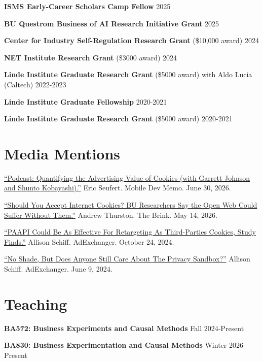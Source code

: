 \documentclass[letterpaper]{article}
\renewenvironment{itemize}{
  \begin{list}{}{
    \setlength{\leftmargin}{1.5em}
  }
}{
  \end{list}
}
\begin{document}
\begin{itemize}
\item \textbf{ISMS Early-Career Scholars Camp Fellow} \hfill 2025
\item \textbf{BU Questrom Business of AI Research Initiative Grant} \hfill 2025
\item \textbf{Center for Industry Self-Regulation Research Grant} (\$10,000 award) \hfill 2024
\item \textbf{NET Institute Research Grant} (\$3000 award) \hfill 2024
\item \textbf{Linde Institute Graduate Research Grant} (\$5000 award) with Aldo Lucia (Caltech) \hfill 2022-2023
\item \textbf{Linde Institute Graduate Fellowship} \hfill 2020-2021 
\item \textbf{Linde Institute Graduate Research Grant} (\$5000 award) \hfill 2020-2021
\end{itemize}

\section*{Media Mentions}
\begin{itemize}
\item \href{https://mobiledevmemo.com/podcast-quantifying-the-advertising-value-of-cookies-with-garrett-johnson-and-shunto-kobayashi/}{``Podcast: Quantifying the Advertising Value of Cookies (with Garrett Johnson and Shunto Kobayashi).''} Eric Seufert. Mobile Dev Memo. June 30, 2026.
\item \href{https://www.bu.edu/articles/2026/should-you-accept-internet-cookies/}{``Should You Accept Internet Cookies? BU Researchers Say the Open Web Could Suffer Without Them.''} Andrew Thurston. The Brink. May 14, 2026.
\item \href{https://www.adexchanger.com/privacy/paapi-could-be-as-effective-for-retargeting-as-third-parties-cookies-study-finds/}{``PAAPI Could Be As Effective For Retargeting As Third-Parties Cookies, Study Finds.''} Allison Schiff. AdExchanger. October 24, 2024.
\item \href{https://www.adexchanger.com/data-privacy-roundup/no-shade-but-does-anyone-still-care-about-the-privacy-sandbox/}{``No Shade, But Does Anyone Still Care About The Privacy Sandbox?''} Allison Schiff. AdExchanger. June 9, 2024.
\end{itemize}

\section*{Teaching}
\begin{itemize}
\item \textbf{BA572: Business Experiments and Causal Methods} \hfill Fall 2024-Present
\item \textbf{BA830: Business Experimentation and Causal Methods} \hfill Winter 2026-Present
\end{itemize}
\end{document}
